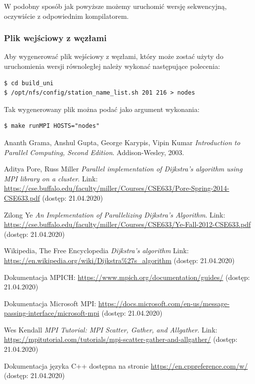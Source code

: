 \documentclass[12pt]{article}
\begin{document}
W podobny sposób jak powyższe możemy uruchomić wersję sekwencyjną, oczywiście z odpowiednim kompilatorem.

\subsubsection{Plik wejściowy z węzłami}

Aby wygenerować plik wejściowy z węzłami, który może zostać użyty do uruchomienia wersji równoległej należy wykonać następujące polecenia:
\begin{lstlisting}
$ cd build_uni
$ /opt/nfs/config/station_name_list.sh 201 216 > nodes
\end{lstlisting}

Tak wygenerowany plik można podać jako argument wykonania:
\begin{lstlisting}
$ make runMPI HOSTS="nodes"
\end{lstlisting}

\newpage
\begin{thebibliography}{9}
Ananth Grama, Anshul Gupta, George Karypis, Vipin Kumar 
\textit{Introduction to Parallel Computing, Second Edition}. 
Addison-Wesley, 2003.

Aditya Pore, Russ Miller
\textit{Parallel implementation of Dijkstra's algorithm using MPI library on a cluster}.
Link: \url{https://cse.buffalo.edu/faculty/miller/Courses/CSE633/Pore-Spring-2014-CSE633.pdf} (dostęp: 21.04.2020)

Zilong Ye
\textit{An Implementation of Parallelizing Dijkstra’s Algorithm}.
Link: \url{https://cse.buffalo.edu/faculty/miller/Courses/CSE633/Ye-Fall-2012-CSE633.pdf} (dostęp: 21.04.2020)

Wikipedia, The Free Encyclopedia
\textit{Dijkstra's algorithm}
Link: \url{https://en.wikipedia.org/wiki/Dijkstra\%27s_algorithm} (dostęp: 21.04.2020)

Dokumentacja MPICH: \url{https://www.mpich.org/documentation/guides/} (dostęp: 21.04.2020)

Dokumentacja Microsoft MPI: \url{https://docs.microsoft.com/en-us/message-passing-interface/microsoft-mpi} (dostęp: 21.04.2020)

Wes Kendall
\textit{MPI Tutorial: MPI Scatter, Gather, and Allgather}.
Link: \url{https://mpitutorial.com/tutorials/mpi-scatter-gather-and-allgather/} (dostęp: 21.04.2020)

Dokumentacja języka C++ dostępna na stronie \url{https://en.cppreference.com/w/} (dostęp: 21.04.2020)


\end{thebibliography}
\end{document}
